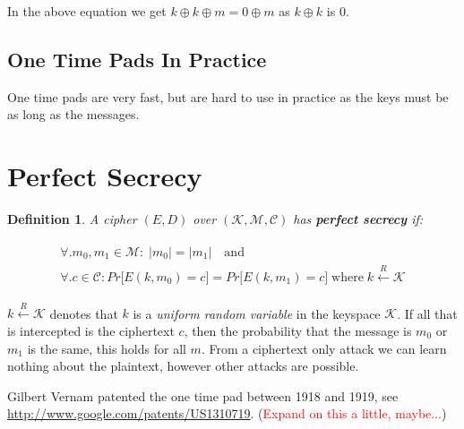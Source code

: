 \documentclass[11pt,a4paper]{report}
\newcommand\todo[1]{\noindent\textcolor{red}{#1}}
\newtheorem{definition}{Definition}
\begin{document}
In the above equation we get $k \oplus k \oplus m = 0 \oplus m$ as $k \oplus k$ is $0$. 

\subsection{One Time Pads In Practice}
One time pads are very fast, but are hard to use in practice as the keys must be as long as the messages.


\section{Perfect Secrecy}
\begin{definition}
	A cipher $(E,D)$ over $(\mathscr{K},\mathscr{M},\mathscr{C})$ has \textbf{perfect secrecy} if:
\end{definition}

\begin{gather}
\begin{gathered}
	\forall. m_0, m_1 \in \mathscr{M} : \; \big\lvert m_0 \big\rvert = \big\lvert m_1 \big\rvert \quad \textrm{and} \\
	\forall. c \in \mathscr{C} : Pr \big\lbrack E(k, m_0) = c \big\rbrack = Pr \big\lbrack E(k, m_1) = c \big\rbrack 
	\; \textrm{where} \; k \xleftarrow{R} \mathscr{K}
\end{gathered}
\end{gather}

$k \xleftarrow{R} \mathscr{K}$ denotes that $k$ is a \emph{uniform random variable} in the keyspace $\mathscr{K}$. If all that is intercepted is the ciphertext $c$, then the probability that the message is $m_0$ or $m_1$ is the same, this holds for all $m$. From a ciphertext only attack we can learn nothing about the plaintext, however other attacks are possible.


\begin{thebibliography}{9} 
	 Gilbert Vernam patented the one time pad between 1918 and 1919, see \url{http://www.google.com/patents/US1310719}. (\todo{Expand on this a little, maybe...})
\end{thebibliography}
\end{document}
